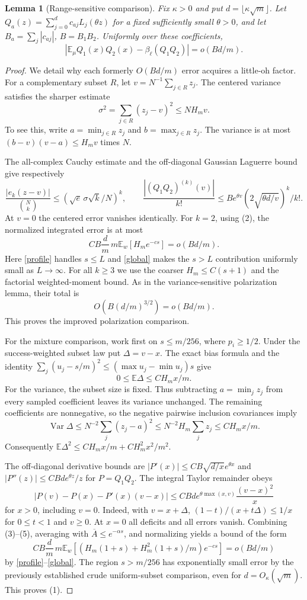 \documentclass[11pt]{article}
\newtheorem{lemma}{Lemma}
\newcommand{\E}{\mathbb E}
\begin{document}
\begin{lemma}[Range-sensitive comparison]\label{compare}
Fix $\kappa>0$ and put $d=\lfloor\kappa\sqrt m\rfloor$.
Let $Q_a(z)=\sum_{j=0}^d c_{aj}L_j(\theta z)$ for a fixed sufficiently
small $\theta>0$, and let $B_a=\sum_j|c_{aj}|$, $B=B_1B_2$.
Uniformly over these coefficients,
\[
 |\E_\mu Q_1(x)Q_2(x)-\beta_\ell(Q_1Q_2)|
 =o(Bd/m).
\tag{1}
\]
\end{lemma}
\begin{proof}
We detail why each formerly $O(Bd/m)$ error acquires a little-oh factor.
For a complementary subset $R$, let $v=N^{-1}\sum_{j\in R}z_j$.
The centered variance satisfies the sharper estimate
\[
 \sigma^2=\sum_{j\in R}(z_j-v)^2\le NH_m v.
\tag{2}
\]
To see this, write $a=\min_{j\in R}z_j$ and $b=\max_{j\in R}z_j$.
The variance is at most $(b-v)(v-a)\le H_m v$ times $N$.

The all-complex Cauchy estimate and the off-diagonal Gaussian Laguerre
bound give respectively
\[
 \frac{|e_k(z-v)|}{\binom Nk}
 \le(\sqrt e\,\sigma\sqrt k/N)^k,
 \qquad
 \frac{|(Q_1Q_2)^{(k)}(v)|}{k!}
 \le B e^{\theta v}(2\sqrt{\theta d/v})^k/k!.
\]
At $v=0$ the centered error vanishes identically. For $k=2$, using (2),
the normalized integrated error is at most
\[
 C B\frac d m\,m\E_w[H_m e^{-cs}]=o(Bd/m).
\]
Here \eqref{profile} handles $s\le L$ and \eqref{global} makes the
$s>L$ contribution uniformly small as $L\to\infty$.
For all $k\ge3$ we use the coarser $H_m\le C(s+1)$ and the factorial
weighted-moment bound. As in the variance-sensitive polarization lemma,
their total is
\[
 O\left(B(d/m)^{3/2}\right)=o(Bd/m).
\]
This proves the improved polarization comparison.

For the mixture comparison, work first on $s\le m/256$, where
$p_i\ge1/2$. Under the success-weighted subset law put $\Delta=v-x$.
The exact bias formula and the identity
$\sum_j(u_j-s/m)^2\le (\max u_j-\min u_j)s$ give
\[
 0\le\E\Delta\le C H_m x/m.
\tag{3}
\]
For the variance, the subset size is fixed. Thus subtracting
$a=\min_jz_j$ from every sampled coefficient leaves its variance
unchanged. The remaining coefficients are nonnegative, so the negative
pairwise inclusion covariances imply
\[
 \operatorname{Var}\Delta
 \le N^{-2}\sum_j(z_j-a)^2
 \le N^{-2}H_m\sum_jz_j
 \le C H_m x/m.
\tag{4}
\]
Consequently $\E\Delta^2\le C H_m x/m+C H_m^2x^2/m^2$.

The off-diagonal derivative bounds are
$|P'(x)|\le C B\sqrt{d/x}e^{\theta x}$ and
$|P''(z)|\le C Bd e^{\theta z}/z$ for $P=Q_1Q_2$.
The integral Taylor remainder obeys
\[
 |P(v)-P(x)-P'(x)(v-x)|
 \le C Bd e^{\theta\max(x,v)}\frac{(v-x)^2}{x}
\tag{5}
\]
for $x>0$, including $v=0$. Indeed, with $v=x+\Delta$,
$(1-t)/(x+t\Delta)\le1/x$ for $0\le t<1$ and $v\ge0$.
At $x=0$ all deficits and all errors vanish.
Combining (3)--(5), averaging with $\overline A\le e^{-\alpha s}$,
and normalizing yields a bound of the form
\[
 C B\frac d m\,m\E_w\left[
   (H_m(1+s)+H_m^2(1+s)/m)e^{-cs}\right]
 =o(Bd/m)
\]
by \eqref{profile}--\eqref{global}. The region $s>m/256$ has
exponentially small error by the previously established crude
uniform-subset comparison, even for $d=O_\kappa(\sqrt m)$.
This proves (1).
\end{proof}
\end{document}
